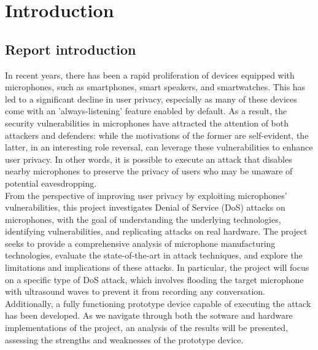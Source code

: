 \chapter{Introduction}
\section{Report introduction}
In recent years, there has been a rapid proliferation of devices equipped with microphones, such as smartphones, smart speakers, and smartwatches.
This has led to a significant decline in user privacy, especially as many of these devices come with an 'always-listening' feature enabled by default.
As a result, the security vulnerabilities in microphones have attracted the attention of both attackers and defenders: while the motivations of the former are self-evident, the latter, in an interesting role reversal, can leverage these vulnerabilities to enhance user privacy.
In other words, it is possible to execute an attack that disables nearby microphones to preserve the privacy of users who may be unaware of potential eavesdropping.\\
\hspace*{2em}From the perspective of improving user privacy by exploiting microphones' vulnerabilities, this project investigates Denial of Service (DoS) attacks on microphones, with the goal of understanding the underlying technologies, identifying vulnerabilities, and replicating attacks on real hardware.
The project seeks to provide a comprehensive analysis of microphone manufacturing technologies, evaluate the state-of-the-art in attack techniques, and explore the limitations and implications of these attacks.
In particular, the project will focus on a specific type of DoS attack, which involves flooding the target microphone with ultrasound waves to prevent it from recording any conversation.
Additionally, a fully functioning prototype device capable of executing the attack has been developed.
As we navigate through both the sotware and hardware implementations of the project, an analysis of the results will be presented, assessing the strengths and weaknesses of the prototype device.
